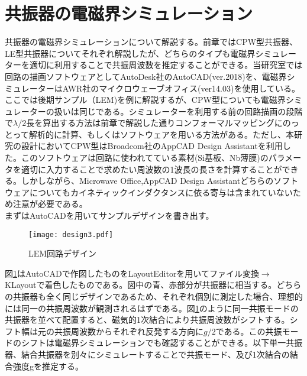 
    \section{共振器の電磁界シミュレーション}
        共振器の電磁界シミュレーションについて解説する。前章ではCPW型共振器、LE型共振器についてそれぞれ解説したが、どちらのタイプも電磁界シミュレーターを適切に利用することで共振周波数を推定することができる。当研究室では回路の描画ソフトウェアとしてAutoDesk社のAutoCAD(ver.2018)を、電磁界シミュレーターはAWR社のマイクロウェーブオフィス(ver14.03)を使用している。\\
        ここでは後期サンプル（LEM)を例に解説するが、CPW型についても電磁界シミュレーターの扱いは同じである。シミュレーターを利用する前の回路描画の段階で$\lambda/2$長を算出する方法は前章で解説した通りコンフォーマルマッピングにのっとって解析的に計算、もしくはソフトウェアを用いる方法がある。ただし、本研究の設計においてCPW型はBroadcom社のAppCAD Design Assistantを利用した。このソフトウェアは回路に使われてている素材(Si基板、Nb薄膜)のパラメータを適切に入力することで求めたい周波数の1波長の長さを計算することができる。しかしながら、Microwave Office,AppCAD Design Assistantどちらのソフトウェアについてもカイネティックインダクタンスに依る寄与は含まれていないため注意が必要である。\\
        まずはAutoCADを用いてサンプルデザインを書き出す。
        \begin{figure}[H]
            \centering
            \texttt{[image: design3.pdf]}
            \caption{LEM回路デザイン}
            \label{LEM}
        \end{figure}
        図\ref*{LEM}はAutoCADで作図したものをLayoutEditorを用いてファイル変換$\rightarrow$KLayoutで着色したものである。図中の青、赤部分が共振器に相当する。どちらの共振器も全く同じデザインであるため、それぞれ個別に測定した場合、理想的には同一の共振周波数が観測されるはずである。図\ref{LEM}のように同一共振モードの共振器を並べて配置すると、磁気的1次結合により共振周波数がシフトする。シフト幅は元の共振周波数からそれぞれ反発する方向に$g/2$である。この共振モードのシフトは電磁界シミュレーションでも確認することができる。以下単一共振器、結合共振器を別々にシミュレートすることで共振モード、及び1次結合の結合強度gを推定する。

